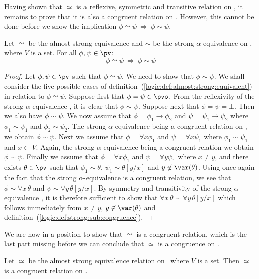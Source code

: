 Having shown that $\simeq$ is a reflexive, symmetric and transitive
relation on \pv, it remains to prove that it is also a congruent
relation on \pv. However, this cannot be done before we show the
implication $\phi\simeq\psi\ \Rightarrow\ \phi\sim\psi$.

\begin{prop}\label{logic:prop:almost:strong:implies:strong}
Let $\simeq$ be the almost strong equivalence and $\sim$ be the
strong $\alpha$-equivalence on \pv, where $V$ is a set. For all
$\phi,\psi\in\pv$:
    \[
    \phi\simeq\psi\ \Rightarrow\ \phi\sim\psi
    \]
\end{prop}

\noindent
\begin{proof}
Let $\phi,\psi\in\pv$ such that $\phi\simeq\psi$. We need to show
that $\phi\sim\psi$. We shall consider the five possible cases of
definition~(\ref{logic:def:almost:strong:equivalent}) in relation to
$\phi\simeq\psi$. Suppose first that $\phi=\psi\in\pvo$. From the
reflexivity of the strong $\alpha$-equivalence , it is clear that
$\phi\sim\psi$. Suppose next that $\phi=\psi=\bot$. Then we also
have $\phi\sim\psi$. We now assume that $\phi=\phi_{1}\to\phi_{2}$
and $\psi=\psi_{1}\to\psi_{2}$ where $\phi_{1}\sim\psi_{1}$ and
$\phi_{2}\sim\psi_{2}$. The strong $\alpha$-equivalence being a
congruent relation on \pv, we obtain $\phi\sim\psi$. Next we assume
that $\phi=\forall x\phi_{1}$ and $\psi=\forall x\psi_{1}$ where
$\phi_{1}\sim\psi_{1}$ and $x\in\ V$. Again, the strong 
$\alpha$-equivalence being a congruent relation we obtain $\phi\sim\psi$.
Finally we assume that $\phi=\forall x\phi_{1}$ and $\psi=\forall
y\psi_{1}$ where $x\neq y$, and there exists $\theta\in\pv$ such
that $\phi_{1}\sim\theta$, $\psi_{1}\sim\theta[y/x]$ and
$y\not\in\var(\theta)$. Using once again the fact that the strong 
$\alpha$-equivalence is a congruent relation, we see that
$\phi\sim\forall x\,\theta$ and $\psi\sim\forall y\,\theta[y/x]$. By
symmetry and transitivity of the strong $\alpha$-equivalence , it
is therefore sufficient to show that $\forall x\,\theta\sim\forall
y\,\theta[y/x]$ which follows immediately from $x\neq y$,
$y\not\in\var(\theta)$ and
definition~(\ref{logic:def:strong:sub:congruence}).
\end{proof}

We are now in a position to show that $\simeq$ is a congruent
relation, which is the last part missing before we can conclude that
$\simeq$ is a congruence on \pv.

\begin{prop}\label{logic:prop:almost:strong:congruent}
Let $\simeq$ be the almost strong equivalence relation on \pv\ where
$V$ is a set. Then $\simeq$ is a congruent relation on \pv.
\end{prop}

